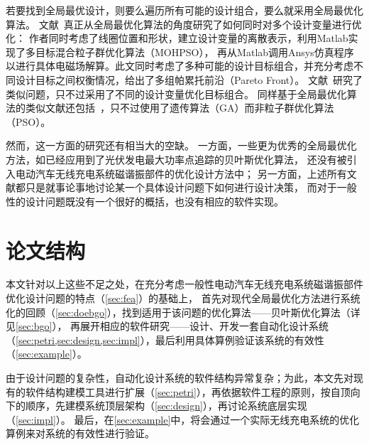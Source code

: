 \documentclass[index]{subfiles}
\begin{document}
若要找到全局最优设计，则要么遍历所有可能的设计组合，要么就采用全局最优化算法。
文献~真正从全局最优化算法的角度研究了如何同时对多个设计变量进行优化：
作者同时考虑了线圈位置和形状，建立设计变量的离散表示，利用Matlab实现了多目标混合粒子群优化算法（MOHPSO），
再从Matlab调用Ansys仿真程序以进行具体电磁场解算。此文同时考虑了多种可能的设计目标组合，并充分考虑不同设计目标之间权衡情况，给出了多组帕累托前沿（Pareto Front）。
文献~研究了类似问题，只不过采用了不同的设计变量优化目标组合。
同样基于全局最优化算法的类似文献还包括~，只不过使用了遗传算法（GA）而非粒子群优化算法（PSO）。

然而，这一方面的研究还有相当大的空缺。
一方面，一些更为优秀的全局最优化方法，如已经应用到了光伏发电最大功率点追踪\cite{abdelrahman2016}的贝叶斯优化算法，
还没有被引入电动汽车无线充电系统磁谐振部件的优化设计方法中；
另一方面，上述所有文献都只是就事论事地讨论某一个具体设计问题下如何进行设计决策，
而对于一般性的设计问题既没有一个很好的概括，也没有相应的软件实现。

\section{论文结构}
本文针对以上这些不足之处，在充分考虑一般性电动汽车无线充电系统磁谐振部件优化设计问题的特点（\cref{sec:fea}）的基础上，
首先对现代全局最优化方法进行系统化的回顾（\cref{sec:doebgo}），找到适用于该问题的优化算法——贝叶斯优化算法（详见\cref{sec:bgo}），
再展开相应的软件研究——设计、开发一套自动化设计系统（\cref{sec:petri,sec:design,sec:impl}），最后利用具体算例验证该系统的有效性（\cref{sec:example}）。

由于设计问题的复杂性，自动化设计系统的软件结构异常复杂；为此，本文先对现有的软件结构建模工具进行扩展（\cref{sec:petri}），再依据软件工程的原则，按自顶向下的顺序，先建模系统顶层架构（\cref{sec:design}），再讨论系统底层实现（\cref{sec:impl}）。
最后，在\cref{sec:example}中，将会通过一个实际无线充电系统的优化算例来对系统的有效性进行验证。
\end{document}
